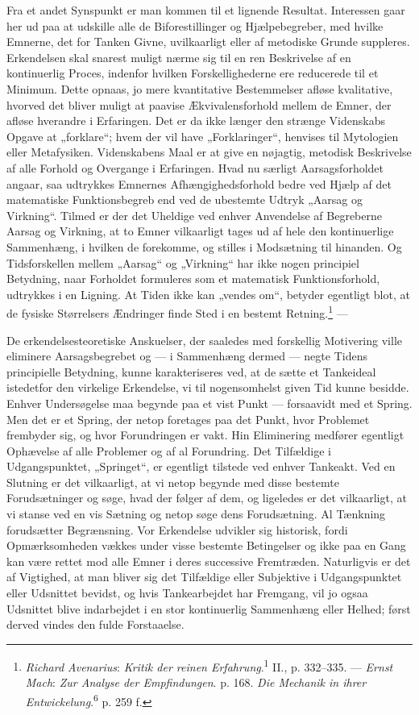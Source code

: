 \documentclass[12pt,a4paper]{book}
\newcommand{\apage}[1]{\marginnote{\footnotesize\textit{[#1]}}}
\begin{document}
Fra et andet Synspunkt er man kommen til et lignende Resultat. Interessen gaar her
ud paa at udskille alle de Biforestillinger og Hjælpebegreber, med hvilke Emnerne,
det for Tanken Givne, uvilkaarligt eller af metodiske Grunde suppleres. Erkendelsen
skal snarest muligt nærme sig til en ren Beskrivelse af en kontinuerlig Proces,
indenfor hvilken Forskellighederne ere reducerede til et Minimum. Dette opnaas, jo
mere kvantitative Bestemmelser afløse kvalitative, hvorved det bliver muligt at
paavise Ækvivalensforhold mellem de Emner, der afløse hverandre i Erfaringen. Det er
da ikke længer den strænge Videnskabs Opgave at „forklare“; hvem der vil have
„Forklaringer“, henvises til Mytologien eller Metafysiken. Videnskabens Maal er at
give en nøjagtig, metodisk Beskrivelse af alle Forhold og Overgange i Erfaringen.
Hvad nu særligt Aarsagsforholdet angaar, saa udtrykkes Emnernes Afhængighedsforhold
bedre ved Hjælp af det matematiske Funktionsbegreb end ved \apage{284} de ubestemte Udtryk
„Aarsag og Virkning“. Tilmed er der det Uheldige ved enhver Anvendelse af Begreberne
Aarsag og Virkning, at to Emner vilkaarligt tages ud af hele den kontinuerlige
Sammenhæng, i hvilken de forekomme, og stilles i Modsætning til hinanden. Og
Tidsforskellen mellem „Aarsag“ og „Virkning“ har ikke nogen principiel Betydning,
naar Forholdet formuleres som et matematisk Funktionsforhold, udtrykkes i en
Ligning. At Tiden ikke kan „vendes om“, betyder egentligt blot, at de fysiske
Størrelsers Ændringer finde Sted i en bestemt Retning.\footnote{\emph{Richard
Avenarius}: \emph{Kritik der reinen Erfahrung}.\textsuperscript{1} II., p. 332--335.
--- \emph{Ernst Mach}: \emph{Zur Analyse der Empfindungen}. p. 168. \emph{Die
Mechanik in ihrer Entwickelung}.\textsuperscript{6} p. 259 f.} ---

De erkendelsesteoretiske Anskuelser, der saaledes med forskellig Motivering ville
eliminere Aarsagsbegrebet og --- i Sammenhæng dermed --- negte Tidens principielle
Betydning, kunne karakteriseres ved, at de sætte et Tankeideal istedetfor den
virkelige Erkendelse, vi til nogensomhelst given Tid kunne besidde. Enhver
Undersøgelse maa begynde paa et vist Punkt --- forsaavidt med et Spring. Men det er
et Spring, der netop foretages paa det Punkt, hvor Problemet frembyder sig, og hvor
Forundringen er vakt. Hin Eliminering medfører egentligt Ophævelse af alle Problemer
og af al Forundring. Det Tilfældige i Udgangspunktet, „Springet“, er egentligt
tilstede ved enhver Tankeakt. Ved en Slutning er det vilkaarligt, at vi netop
begynde med disse bestemte Forudsætninger og søge, hvad der følger af dem, og
ligeledes er det vilkaarligt, at vi stanse ved en vis Sætning og netop søge dens
Forudsætning. Al Tænkning forudsætter Begrænsning. Vor Erkendelse udvikler sig
historisk, fordi Opmærksomheden vækkes under visse bestemte Betingelser og ikke paa
en Gang kan være rettet mod alle Emner i deres successive Fremtræden. Naturligvis er
det af Vigtighed, at man bliver sig det Tilfældige eller Subjektive i Udgangspunktet
eller Udsnittet bevidst, og hvis Tankearbejdet har Fremgang, vil jo ogsaa Udsnittet
blive indarbejdet i en stor kontinuerlig Sammenhæng eller Helhed; først derved
vindes den fulde Forstaaelse.
\end{document}
